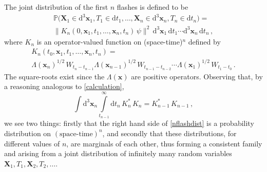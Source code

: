 \documentclass[12pt]{article}
\newcommand{\PPP}{\mathbb{P}}
\newcommand{\vx}{\boldsymbol{x}}
\newcommand{\vX}{{\boldsymbol{X}}}
\newcommand{\D}{\mathrm{d}} %
\newcommand{\1}{1}
\newcommand{\K}{K}
\begin{document}
The joint distribution of the first $n$ flashes is defined to be
\begin{multline}\label{nflashdist}
  \PPP\bigl( \vX_1\in \D^3 \vx_1, T_1 \in \D t_1, \ldots,
  \vX_n \in \D^3 \vx_n, T_n \in \D t_n \bigr) =\\ 
  \bigl\| \K_n(0,\vx_1, t_1, \ldots, \vx_n, t_n) \, \psi \bigr\|^2 
  \, \D^3 \vx_1 \, \D t_1 \cdots \D^3 \vx_n \, \D t_n \,,
\end{multline}
where $\K_n$ is an operator-valued function on (space-time)$^n$ defined by
\begin{multline}\label{Kndef}
  \K_n(t_0,\vx_1, t_1, \ldots, \vx_n, t_n) =\\
  \Lambda(\vx_n)^{1/2} \,W_{t_n-t_{n-1}} \Lambda(\vx_{n-1})^{1/2} \,W_{t_{n-1}-t_{n-2}}
  \cdots \Lambda(\vx_1)^{1/2} \, W_{t_1-t_0} \,.
\end{multline}
The square-roots exist since the $\Lambda(\vx)$ are positive operators. Observing that, by a reasoning analogous to \eqref{calculation}, 
\begin{equation}
  \int \D^3 \vx_n \int\limits_{t_{n-1}}^\infty \D t_n \, \K^*_n \,\K_n = 
  \K^*_{n-1} \, \K_{n-1} \,,
\end{equation}
we see two things: firstly that the right hand side of \eqref{nflashdist} is a probability distribution on $(\text{space-time})^n$, and secondly that these distributions, for different values of $n$, are marginals of each other, thus forming a consistent family and arising from a joint distribution of infinitely many random variables $\vX_1, T_1, \vX_2, T_2, \ldots$. 
\end{document}
